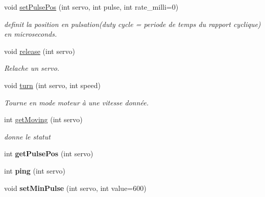 \begin{DoxyCompactItemize}
\mbox{\label{classServoDriver_a9122b024a721ff5c3701d9a0af5df385}} 
void \hyperlink{classServoDriver_a9122b024a721ff5c3701d9a0af5df385}{set\+Pulse\+Pos} (int servo, int pulse, int rate\+\_\+milli=0)
\begin{DoxyCompactList}\small\item\em definit la position en pulsation(duty cycle = periode de temps du rapport cyclique) en microseconds. \end{DoxyCompactList}\item 
\mbox{\label{classServoDriver_aa1040b0db7ed851aec70a122301fe665}} 
void \hyperlink{classServoDriver_aa1040b0db7ed851aec70a122301fe665}{release} (int servo)
\begin{DoxyCompactList}\small\item\em Relache un servo. \end{DoxyCompactList}\item 
\mbox{\label{classServoDriver_ad68ebde8a710451c8fea2cd03cfa4bc0}} 
void \hyperlink{classServoDriver_ad68ebde8a710451c8fea2cd03cfa4bc0}{turn} (int servo, int speed)
\begin{DoxyCompactList}\small\item\em Tourne en mode moteur à une vitesse donnée. \end{DoxyCompactList}\item 
int \hyperlink{classServoDriver_a0a8e84f0bbcff39549ddfc239f1a6237}{get\+Moving} (int servo)
\begin{DoxyCompactList}\small\item\em donne le statut \end{DoxyCompactList}\item 
\mbox{\label{classServoDriver_a716d64d7b2203c9cb8dff5c90d0a5dd9}} 
int {\bfseries get\+Pulse\+Pos} (int servo)
\item 
\mbox{\label{classServoDriver_a952fbbfdbf9d0b57d5c6d6c09019b366}} 
int {\bfseries ping} (int servo)
\item 
\mbox{\label{classServoDriver_a40ec259cb0ced3154b1e73cc52d48938}} 
void {\bfseries set\+Min\+Pulse} (int servo, int value=600)
\item 
\mbox{\label{classServoDriver_a92d53f7f50a7eb95e14ae358ad0b7d23}} 

\end{DoxyCompactItemize}

